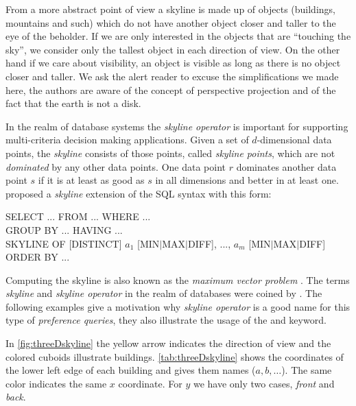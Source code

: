 From a more abstract point of view a skyline is made up of objects
(buildings, mountains and such) which do not have another object
closer and taller to the eye of the beholder. If we are only
interested in the objects that are ``touching the sky'', we consider
only the tallest object in each direction of view. On the other hand
if we care about visibility, an object is visible as long as there is
no object closer and taller. We ask the alert reader to excuse the
simplifications we made here, the authors are aware of the concept of
perspective projection and of the fact that the earth is not a disk.

\bigskip
In the realm of database systems the \emph{skyline operator} is
important for supporting multi-criteria decision making applications.
Given a set of $d$-dimensional data points, the \emph{skyline}
consists of those points, called \emph{skyline points}, which are not
\emph{dominated} by any other data points. One data point $r$ dominates
another data point $s$ if it is at least as good as $s$ in all
dimensions and better in at least one.
\citet{Borzsonyi2001} proposed a {\em skyline} extension of the SQL
syntax with this form:

\begin{sql}
SELECT ... FROM ... WHERE ... \\
GROUP BY ... HAVING ...       \\
SKYLINE OF \textnormal{[}DISTINCT\textnormal{]} $a_1$ \textnormal{[}MIN$|$MAX$|$DIFF\textnormal{]}, ..., $a_m$ \textnormal{[}MIN$|$MAX$|$DIFF\textnormal{]} \\
ORDER BY ...
\end{sql}

Computing the skyline is also known as the \emph{maximum vector
problem} \citep{Kung1975, Preparata1985}. The terms \emph{skyline} and
\emph{skyline operator} in the realm of databases were coined by
\citet{Borzsonyi2001}. The following examples give a motivation why 
\emph{skyline operator} is a good name for this type of
\emph{preference queries}, they also illustrate the usage of the
 and  keyword.

In \autoref{fig:threeDskyline} the yellow arrow indicates the
direction of view and the colored cuboids illustrate
buildings. \autoref{tab:threeDskyline} shows the coordinates of the
lower left edge of each building and gives them names ($a, b,
\ldots$). The same color indicates the same $x$ coordinate. For $y$ we
have only two cases, \emph{front} and
\emph{back}.

